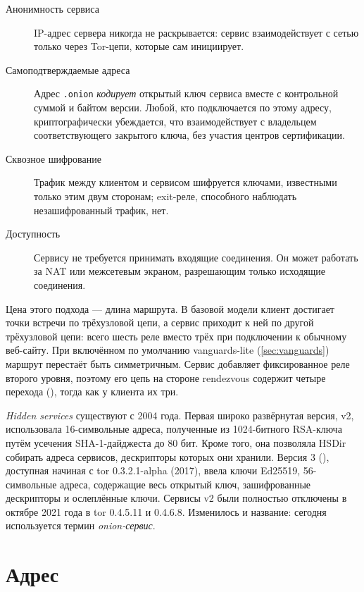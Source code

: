 \begin{description}
  \item[Анонимность сервиса] IP-адрес сервера никогда не раскрывается: сервис взаимодействует с сетью только через Tor-цепи, которые сам инициирует.
  \item[Самоподтверждаемые адреса] Адрес \texttt{.onion} \emph{кодирует} открытый ключ сервиса вместе с контрольной суммой и байтом версии. Любой, кто подключается по этому адресу, криптографически убеждается, что взаимодействует с владельцем соответствующего закрытого ключа, без участия центров сертификации.
  \item[Сквозное шифрование] Трафик между клиентом и сервисом шифруется ключами, известными только этим двум сторонам; exit-реле, способного наблюдать незашифрованный трафик, нет.
  \item[Доступность] Сервису не требуется принимать входящие соединения. Он может работать за NAT или межсетевым экраном, разрешающим только исходящие соединения.
\end{description}

Цена этого подхода — длина маршрута. В базовой модели клиент достигает точки встречи по трёхузловой цепи, а сервис приходит к ней по другой трёхузловой цепи: всего шесть реле вместо трёх при подключении к обычному веб-сайту. При включённом по умолчанию vanguards-lite (\cref{sec:vanguards}) маршрут перестаёт быть симметричным. Сервис добавляет фиксированное реле второго уровня, поэтому его цепь на стороне rendezvous содержит четыре перехода (), тогда как у клиента их три.

\begin{storia}[От v2 к v3]
\emph{Hidden services} существуют с 2004 года. Первая широко развёрнутая версия, v2, использовала 16-символьные адреса, полученные из 1024-битного RSA-ключа путём усечения SHA-1-дайджеста до 80 бит. Кроме того, она позволяла HSDir собирать адреса сервисов, дескрипторы которых они хранили. Версия 3 (), доступная начиная с tor 0.3.2.1-alpha (2017), ввела ключи Ed25519, 56-символьные адреса, содержащие весь открытый ключ, зашифрованные дескрипторы и ослеплённые ключи. Сервисы v2 были полностью отключены в октябре 2021 года в tor 0.4.5.11 и 0.4.6.8. Изменилось и название: сегодня используется термин \emph{onion-сервис}.
\end{storia}

\section{Адрес}\label{sec:os-indirizzo}

